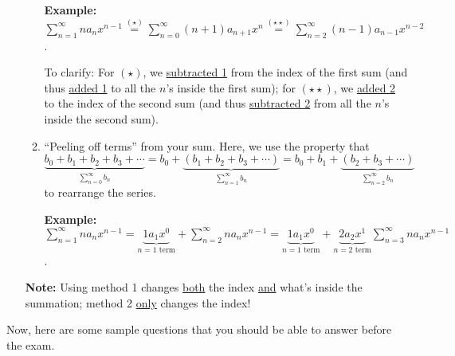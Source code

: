 \documentclass[12pt]{article}
\theoremstyle{definition}
\theoremstyle{underl}
\begin{document}
\begin{itemize}[topsep=0.125in,itemsep=0.625mm]
\begin{enumerate}
			\vspace{3mm}
			\textbf{Example:} $\sum_{n=1}^\infty na_nx^{n-1}\overset{(\star)}{=}\sum_{n=0}^\infty (n+1)a_{n+1}x^n\overset{(\star\star)}{=}\sum_{n=2}^\infty (n-1)a_{n-1}x^{n-2}$. 
			\vspace{3mm}
			
			To clarify: For $(\star)$, we \ul{subtracted 1} from the index of the first sum (and thus \ul{added 1} to all the $n$'s inside the first sum); for $(\star\star)$, we \ul{added 2} to the index of the second sum (and thus \ul{subtracted 2} from all the $n$'s inside the second sum).
			
			\item ``Peeling off terms'' from your sum. Here, we use the property that 
			\[\underbrace{b_0+b_1+b_2+b_3+\cdots}_{\sum_{n=0}^\infty b_n}=b_0+\underbrace{\left(b_1+b_2+b_3+\cdots\right)}_{\sum_{n=1}^\infty b_n}=b_0+b_1+\underbrace{\left(b_2+b_3+\cdots\right)}_{\sum_{n=2}^\infty b_n}\]
			to rearrange the series.
			
			\vspace{3mm}
			\textbf{Example:} $\sum_{n=1}^\infty na_nx^{n-1}=\underbrace{1a_1x^0}_{n=1\text{ term}}+\sum_{n=2}^\infty na_nx^{n-1}=\underbrace{1a_1x^0}_{n=1\text{ term}}+\underbrace{2a_2x^1}_{n=2\text{ term}}\sum_{n=3}^\infty na_nx^{n-1}$. 
			\vspace{3mm}
		\end{enumerate}
		\textbf{Note:} Using method 1 changes \ul{both} the index \ul{and} what's inside the summation; method 2 \ul{only} changes the index!
	\end{itemize}
	
	\newpage
	
	\noindent Now, here are some sample questions that you should be able to answer before the exam.
	
\end{document}
